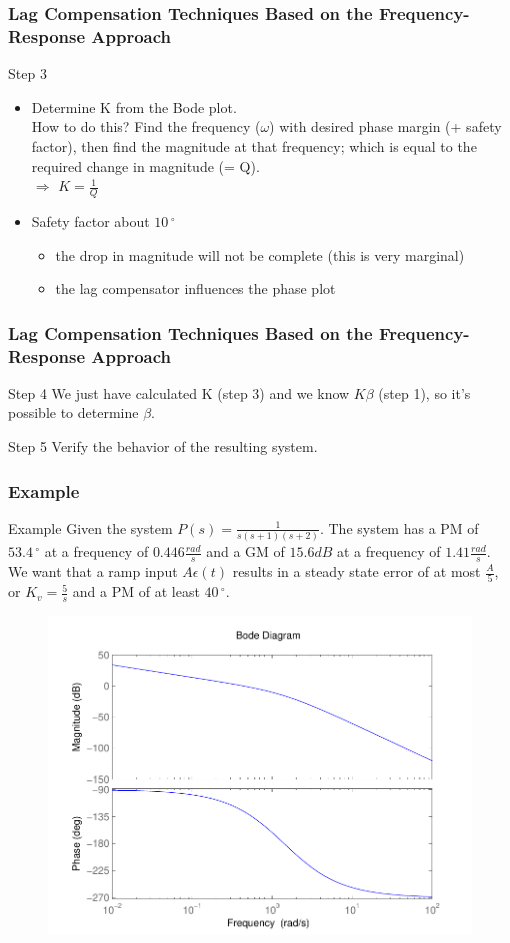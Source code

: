 \begin{frame}
\frametitle{Lag Compensation Techniques Based on the Frequency-Response Approach}
\begin{block}{Step 3}
	\begin{itemize}
	\item	Determine K from the Bode plot. \\
		How to do this?
		Find the frequency ($\omega$) with desired phase margin (+ safety factor), then find the magnitude at that frequency; which is equal to the required change in magnitude (= Q). \\
		$\Rightarrow$ $K = \frac{1}{Q}$ \\
		\item Safety factor about $10\,^{\circ}$
		\begin{itemize}
			\item the drop in magnitude will not be complete (this is very marginal)
			\item the lag compensator influences the phase plot
		\end{itemize}
	\end{itemize}
\end{block}
\end{frame}

\begin{frame}
\frametitle{Lag Compensation Techniques Based on the Frequency-Response Approach}
\begin{block}{Step 4}
	We just have calculated K (step 3) and we know $K\beta$ (step 1), so it's possible to determine $\beta$.
\end{block}
\begin{block}{Step 5}
	Verify the behavior of the resulting system.
\end{block}
\end{frame}

\begin{frame}
\frametitle{Example}
\begin{block}{Example}
Given the system $P(s) = \frac{1}{s(s+1)(s+2)}$. The system has a PM of $53.4\,^{\circ}$ at a frequency of $0.446\frac{rad}{s}$ and a GM of $15.6 dB$ at a frequency of $1.41\frac{rad}{s}$.
We want that a ramp input $A\epsilon(t)$ results in a steady state error of at most $\frac{A}{5}$, or $K_v =\frac{5}{s}$ and a PM of at least $40\,^{\circ}$.
\begin{figure}
	\centering
	\includegraphics[width=0.5
	\linewidth]{bodeexamplelag}
\end{figure}
\end{block}
\end{frame}

